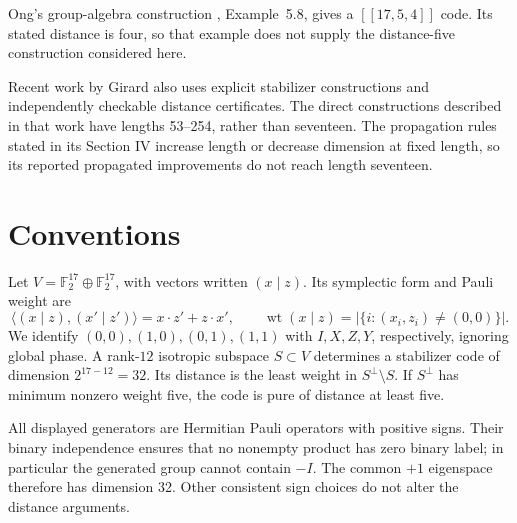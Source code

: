 \documentclass[11pt]{article}
\newcommand{\F}{\mathbb F}
\newcommand{\wt}{\operatorname{wt}}
\begin{document}
Ong's group-algebra construction \cite{ong}, Example~5.8, gives a $[[17,5,4]]$ code. Its stated distance is four, so that example does not supply the distance-five construction considered here.

Recent work by Girard \cite{girard} also uses explicit stabilizer constructions and independently checkable distance certificates. The direct constructions described in that work have lengths 53--254, rather than seventeen. The propagation rules stated in its Section IV increase length or decrease dimension at fixed length, so its reported propagated improvements do not reach length seventeen.

\section{Conventions}
Let $V=\F_2^{17}\oplus\F_2^{17}$, with vectors written $(x\mid z)$. Its symplectic form and Pauli weight are
\[
 \langle(x\mid z),(x'\mid z')\rangle=x\cdot z'+z\cdot x',\qquad
 \wt(x\mid z)=|\{i:(x_i,z_i)\ne(0,0)\}|.
\]
We identify $(0,0),(1,0),(0,1),(1,1)$ with $I,X,Z,Y$, respectively, ignoring global phase. A rank-$12$ isotropic subspace $S\subset V$ determines a stabilizer code of dimension $2^{17-12}=32$. Its distance is the least weight in $S^\perp\setminus S$. If $S^\perp$ has minimum nonzero weight five, the code is pure of distance at least five.

All displayed generators are Hermitian Pauli operators with positive signs. Their binary independence ensures that no nonempty product has zero binary label; in particular the generated group cannot contain $-I$. The common $+1$ eigenspace therefore has dimension 32. Other consistent sign choices do not alter the distance arguments.
\end{document}
